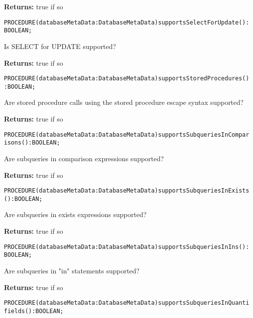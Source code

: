 {\bf Returns: } 
true if so 




\verb'PROCEDURE(databaseMetaData:DatabaseMetaData)supportsSelectForUpdate():BOOLEAN;'






Is SELECT for UPDATE supported? 


{\bf Returns: } 
true if so 




\verb'PROCEDURE(databaseMetaData:DatabaseMetaData)supportsStoredProcedures():BOOLEAN;'






Are stored procedure calls using the stored procedure escape syntax supported? 


{\bf Returns: } 
true if so 




\verb'PROCEDURE(databaseMetaData:DatabaseMetaData)supportsSubqueriesInComparisons():BOOLEAN;'






Are subqueries in comparison expressions supported?


{\bf Returns: } 
true if so 




\verb'PROCEDURE(databaseMetaData:DatabaseMetaData)supportsSubqueriesInExists():BOOLEAN;'






Are subqueries in exists expressions supported?


{\bf Returns: } 
true if so 




\verb'PROCEDURE(databaseMetaData:DatabaseMetaData)supportsSubqueriesInIns():BOOLEAN;'






Are subqueries in "in" statements supported?


{\bf Returns: } 
true if so 




\verb'PROCEDURE(databaseMetaData:DatabaseMetaData)supportsSubqueriesInQuantifields():BOOLEAN;'






